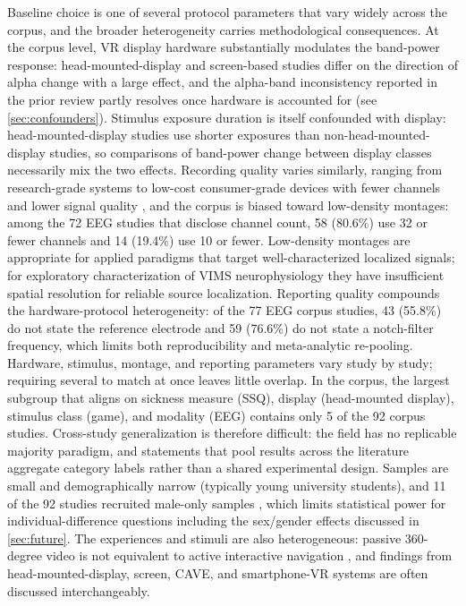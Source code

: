 Baseline choice is one of several protocol parameters that vary widely across the corpus, and the broader heterogeneity carries methodological consequences.
At the corpus level, VR display hardware substantially modulates the band-power response: head-mounted-display and screen-based studies differ on the direction of alpha change with a large effect, and the alpha-band inconsistency reported in the prior review \cite{changBrainActivityCybersickness2023} partly resolves once hardware is accounted for (see \autoref{sec:confounders}).
Stimulus exposure duration is itself confounded with display: head-mounted-display studies use shorter exposures than non-head-mounted-display studies, so comparisons of band-power change between display classes necessarily mix the two effects.
Recording quality varies similarly, ranging from research-grade systems to low-cost consumer-grade devices with fewer channels and lower signal quality \cite{liuPilotStudyEEGBased2020}, and the corpus is biased toward low-density montages: among the 72 EEG studies that disclose channel count, 58 (80.6\%) use 32 or fewer channels and 14 (19.4\%) use 10 or fewer.
Low-density montages are appropriate for applied paradigms that target well-characterized localized signals; for exploratory characterization of VIMS neurophysiology they have insufficient spatial resolution for reliable source localization.
Reporting quality compounds the hardware-protocol heterogeneity: of the 77 EEG corpus studies, 43 (55.8\%) do not state the reference electrode and 59 (76.6\%) do not state a notch-filter frequency, which limits both reproducibility and meta-analytic re-pooling.
Hardware, stimulus, montage, and reporting parameters vary study by study; requiring several to match at once leaves little overlap.
In the corpus, the largest subgroup that aligns on sickness measure (SSQ), display (head-mounted display), stimulus class (game), and modality (EEG) contains only 5 of the 92 corpus studies.
Cross-study generalization is therefore difficult: the field has no replicable majority paradigm, and statements that pool results across the literature aggregate category labels rather than a shared experimental design.
Samples are small and demographically narrow (typically young university students), and 11 of the 92 studies recruited male-only samples \cite{jangEstimatingObjectiveEEG2022, namElectroencephalogramMicrostatesFunctional2022}, which limits statistical power for individual-difference questions including the sex/gender effects discussed in \autoref{sec:future}.
The experiences and stimuli are also heterogeneous: passive 360-degree video \cite{suwandiExploringImpactMotion2024} is not equivalent to active interactive navigation \cite{cortesEEGbasedExperimentVR2023}, and findings from head-mounted-display, screen, CAVE, and smartphone-VR systems \cite{limTestretestReliabilityVirtual2021, zhangAnalysisMotionSickness2020} are often discussed interchangeably.

